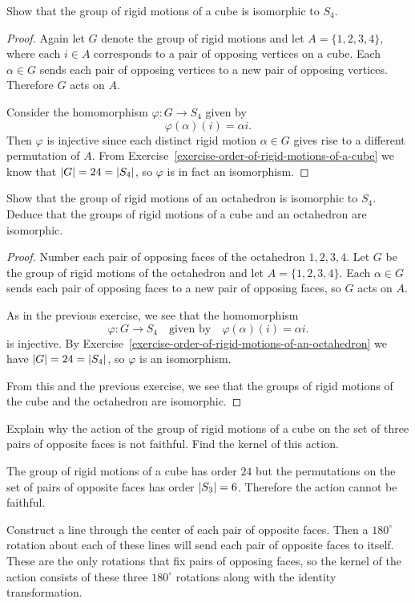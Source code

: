  Show that the group of rigid motions of a cube is
isomorphic to $S_4$.
\begin{proof}
  Again let $G$ denote the group of rigid motions and let
  $A = \{1,2,3,4\}$, where each $i\in A$ corresponds to a pair of
  opposing vertices on a cube. Each $\alpha\in G$ sends each pair of
  opposing vertices to a new pair of opposing vertices. Therefore $G$
  acts on $A$.

  Consider the homomorphism $\varphi\colon G\to S_4$ given by
  \begin{equation*}
    \varphi(\alpha)(i) = \alpha i.
  \end{equation*}
  Then $\varphi$ is injective since each distinct rigid motion
  $\alpha\in G$ gives rise to a different permutation of $A$. From
  Exercise~\ref{exercise-order-of-rigid-motions-of-a-cube} we know
  that $\lvert{G}\rvert = 24 = \lvert{S_4}\rvert$, so $\varphi$ is in fact an
  isomorphism.
\end{proof}

 Show that the group of rigid motions of an octahedron is
isomorphic to $S_4$. Deduce that the groups of rigid motions of a cube
and an octahedron are isomorphic.
\begin{proof}
  Number each pair of opposing faces of the octahedron $1,2,3,4$. Let
  $G$ be the group of rigid motions of the octahedron and let
  $A = \{1,2,3,4\}$. Each $\alpha\in G$ sends each pair of opposing
  faces to a new pair of opposing faces, so $G$ acts on $A$.

  As in the previous exercise, we see that the homomorphism
  \begin{equation*}
    \varphi\colon G\to S_4
    \quad\text{given by}\quad
    \varphi(\alpha)(i) = \alpha i.
  \end{equation*}
  is injective. By
  Exercise~\ref{exercise-order-of-rigid-motions-of-an-octahedron} we
  have $\lvert{G}\rvert = 24 = \lvert{S_4}\rvert$, so $\varphi$ is an isomorphism.

  From this and the previous exercise, we see that the groups of rigid
  motions of the cube and the octahedron are isomorphic.
\end{proof}

 Explain why the action of the group of rigid motions of
a cube on the set of three pairs of opposite faces is not
faithful. Find the kernel of this action.
\begin{solution}
  The group of rigid motions of a cube has order $24$ but the
  permutations on the set of pairs of opposite faces has order
  $\lvert{S_3}\rvert = 6$. Therefore the action cannot be faithful.

  Construct a line through the center of each pair of opposite
  faces. Then a $180^\circ$ rotation about each of these lines will
  send each pair of opposite faces to itself. These are the only
  rotations that fix pairs of opposing faces, so the kernel of the
  action consists of these three $180^\circ$ rotations along with the
  identity transformation.
\end{solution}
